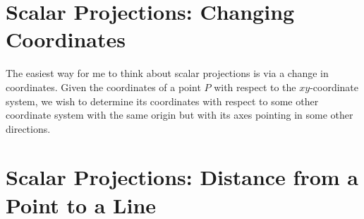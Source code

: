 \documentclass{ximera}
\begin{document}
\section{Scalar Projections: Changing Coordinates}
The easiest way for me to think about scalar projections is via a change in coordinates. Given the coordinates of a point $P$ with respect to the $xy$-coordinate system, we wish to determine its coordinates with respect to some other coordinate system with the same origin but with its axes pointing in some other directions.

\begin{exploration}
 
\begin{onlineOnly}
    \begin{center}
\end{center}
\end{onlineOnly}
\end{exploration}



\section{Scalar Projections: Distance from a Point to a Line}

\begin{exploration}
 
\begin{onlineOnly}
    \begin{center}
\end{center}
\end{onlineOnly}
\end{exploration}
\end{document}
